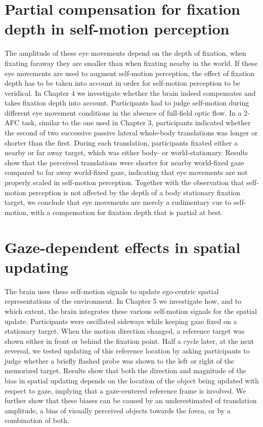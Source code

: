 \section{Partial compensation for fixation depth in self-motion perception}
The amplitude of these eye movements depend on the depth of fixation, when fixating  faraway they are smaller than when fixating nearby in the world. If these eye movements are used to augment self-motion perception, the effect of fixation depth has to be taken into account in order for self-motion perception to be veridical. In Chapter 4 we investigate whether the brain indeed compensates and takes fixation depth into account. Participants had to judge self-motion during different eye movement conditions in the absence of full-field optic flow. In a 2-AFC task, similar to the one used in Chapter 3, participants indicated whether the second of two successive passive lateral whole-body translations was longer or shorter than the first. During each translation, participants fixated either a nearby or far away target, which was either body- or world-stationary. Results show that the perceived translations were shorter for nearby world-fixed gaze compared to far away world-fixed gaze, indicating that eye movements are not properly scaled in self-motion perception. Together with the observation that self-motion perception is not affected by the depth of a body stationary fixation target, we conclude that eye movements are merely a rudimentary cue to self-motion, with a compensation for fixation depth that is partial at best.

\section{Gaze-dependent effects in spatial updating}
The brain uses these self-motion signals to update ego-centric spatial representations of the environment. In Chapter 5 we investigate how, and to which extent, the brain integrates these various self-motion signals for the spatial update. Participants were oscillated sideways while keeping gaze fixed on a stationary target. When the motion direction changed, a reference target was shown either in front or behind the fixation point. Half a cycle later, at the next reversal, we tested updating of this reference location by asking participants to judge whether a briefly flashed probe was shown to the left or right of the memorized target. Results show that both the direction and magnitude of the bias in spatial updating depends on the location of the object being updated with respect to gaze, implying that a gaze-centered reference frame is involved. We further show that these biases can be caused by an underestimated of translation amplitude, a bias of visually perceived objects towards the fovea, or by a combination of both.


